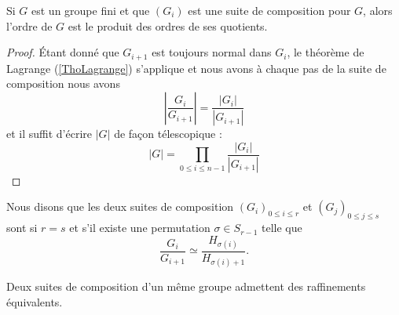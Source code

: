 \begin{proposition}
    Si \( G\) est un groupe fini et que \( (G_i)\) est une suite de composition pour \( G\), alors l'ordre de \( G\) est le produit des ordres de ses quotients.
\end{proposition}

\begin{proof}
    Étant donné que \( G_{i+1}\) est toujours normal dans \( G_i\), le théorème de Lagrange (\ref{ThoLagrange}) s'applique et nous avons à chaque pas de la suite de composition nous avons
    \begin{equation}
        | \frac{ G_i }{ G_{i+1} } |=\frac{ | G_i | }{ | G_{i+1} | } 
    \end{equation}
    et il suffit d'écrire \( | G |\) de façon télescopique :
    \begin{equation}
        | G |=\prod_{0\leq i\leq n-1}\frac{ | G_i | }{ | G_{i+1} | }
    \end{equation}
\end{proof}

Nous disons que les deux suites de composition \( (G_i)_{0\leq i\leq r}\) et \( (G_j)_{0\leq j\leq s}\) sont  si \( r=s\) et s'il existe une permutation \( \sigma\in S_{r-1}\) telle que
\begin{equation}
    \frac{ G_i }{ G_{i+1} }\simeq\frac{ H_{\sigma(i)} }{ H_{\sigma(i)+1} }.
\end{equation}

\begin{proposition}[Schreider]
    Deux suites de composition d'un même groupe admettent des raffinements équivalents.
\end{proposition}

